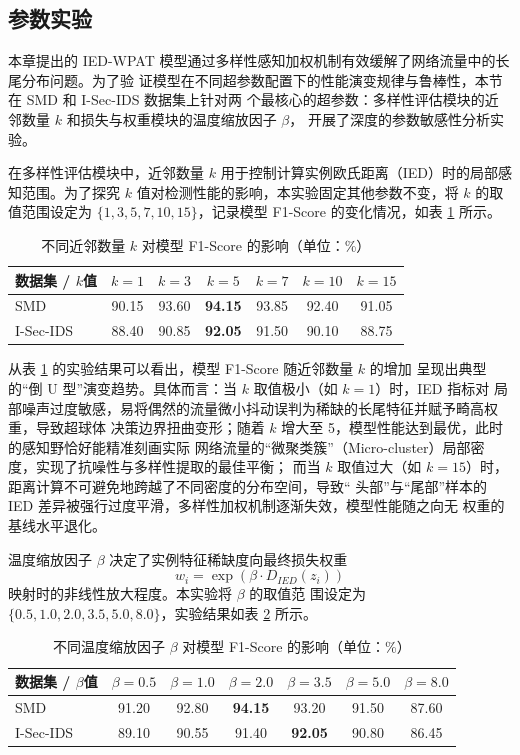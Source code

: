 \subsection{参数实验}
本章提出的 IED-WPAT 模型通过多样性感知加权机制有效缓解了网络流量中的长尾分布问题。为了验
证模型在不同超参数配置下的性能演变规律与鲁棒性，本节在 SMD 和 I-Sec-IDS 数据集上针对两
个最核心的超参数：多样性评估模块的近邻数量 $k$ 和损失与权重模块的温度缩放因子 $\beta$，
开展了深度的参数敏感性分析实验。

在多样性评估模块中，近邻数量 $k$ 用于控制计算实例欧氏距离（IED）时的局部感知范围。为了探究
$k$ 值对检测性能的影响，本实验固定其他参数不变，将 $k$ 的取值范围设定为 
$\{1, 3, 5, 7, 10, 15\}$，记录模型 F1-Score 的变化情况，如表 \ref{tab:param_k} 所示。

\begin{table}[htbp]
\centering
\caption{不同近邻数量 $k$ 对模型 F1-Score 的影响（单位：\%）}
\label{tab:param_k}
\begin{tabular}{lcccccc}
\toprule
数据集 / $k$值 & $k=1$ & $k=3$ & $k=5$ & $k=7$ & $k=10$ & $k=15$ \\
\midrule
SMD & 90.15 & 93.60 & \textbf{94.15} & 93.85 & 92.40 & 91.05 \\
I-Sec-IDS & 88.40 & 90.85 & \textbf{92.05} & 91.50 & 90.10 & 88.75 \\
\bottomrule
\end{tabular}
\end{table}

从表 \ref{tab:param_k} 的实验结果可以看出，模型 F1-Score 随近邻数量 $k$ 的增加
呈现出典型的“倒 U 型”演变趋势。具体而言：当 $k$ 取值极小（如 $k=1$）时，IED 指标对
局部噪声过度敏感，易将偶然的流量微小抖动误判为稀缺的长尾特征并赋予畸高权重，导致超球体
决策边界扭曲变形；随着 $k$ 增大至 5，模型性能达到最优，此时的感知野恰好能精准刻画实际
网络流量的“微聚类簇”（Micro-cluster）局部密度，实现了抗噪性与多样性提取的最佳平衡；
而当 $k$ 取值过大（如 $k=15$）时，距离计算不可避免地跨越了不同密度的分布空间，导致“
头部”与“尾部”样本的 IED 差异被强行过度平滑，多样性加权机制逐渐失效，模型性能随之向无
权重的基线水平退化。

温度缩放因子 $\beta$ 决定了实例特征稀缺度向最终损失权重 
\begin{equation}
w_i = \exp(\beta \cdot D_{IED}(z_i))
\end{equation}
映射时的非线性放大程度。本实验将 $\beta$ 的取值范
围设定为 $\{0.5, 1.0, 2.0, 3.5, 5.0, 8.0\}$，实验结果如表 \ref{tab:param_beta} 所示。

\begin{table}[htbp]
\centering
\caption{不同温度缩放因子 $\beta$ 对模型 F1-Score 的影响（单位：\%）}
\label{tab:param_beta}
\begin{tabular}{lcccccc}
\toprule
数据集 / $\beta$值 & $\beta=0.5$ & $\beta=1.0$ & $\beta=2.0$ & $\beta=3.5$ & $\beta=5.0$ & $\beta=8.0$ \\
\midrule
SMD & 91.20 & 92.80 & \textbf{94.15} & 93.20 & 91.50 & 87.60 \\
I-Sec-IDS & 89.10 & 90.55 & 91.40 & \textbf{92.05} & 90.80 & 86.45 \\
\bottomrule
\end{tabular}
\end{table}

